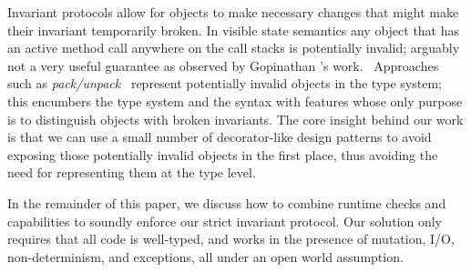Invariant protocols allow for objects to make necessary changes that might make their invariant temporarily broken.
In visible state semantics any object that has an active method call anywhere on the call stacks is potentially invalid;
arguably not a very useful guarantee as observed by
Gopinathan \etal's work.~\cite{Gopinathan:2008:RMO:1483018.1483028}
Approaches such as \textit{pack/unpack}~\cite{DBLP:journals/jot/BarnettDFLS04} 
represent potentially invalid objects in the type system; this
encumbers the type system and the syntax with features whose only purpose is to distinguish objects with broken invariants.
The core insight behind our work 
is that we can use a small number of decorator-like design patterns to avoid exposing those potentially invalid objects 
in the first place, thus avoiding the need for representing them at the type level.



In the remainder of this paper, we discuss how to combine runtime checks and capabilities
to soundly enforce our strict invariant protocol.
Our solution only requires 
that all code is well-typed, and works in the presence of mutation, I/O, non-determinism, and exceptions, all under an open world assumption.

